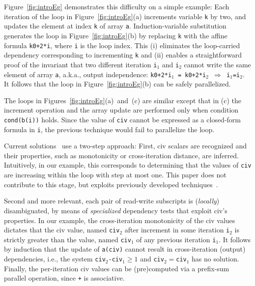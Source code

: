 \documentclass{sig-alternate}
\begin{document}
\enlargethispage{\baselineskip}

Figure~\ref{fig:introEg} demonstrates this difficulty on a
simple example:
%
Each iteration of the loop in Figure~\ref{fig:introEg}(a) increments 
variable {\tt k} by two, and updates the element at index {\tt k} of 
array {\tt a}. %
%
Induction-variable substitution generates the loop in Figure~\ref{fig:introEg}(b) 
by replacing {\tt k} with the affine formula {\tt k0+2*i}, where {\tt i} is the 
loop index.   This (i) eliminates the loop-carried dependency corresponding to 
incrementing {\tt k} and (ii) enables a straightforward proof of the invariant
that two different iteration {\tt i$_1$} and {\tt i$_2$} cannot write the same
element of array {\tt a}, a.k.a., output independence: 
{\tt k0+2*i$_1$~=~k0+2*i$_2$ $\Rightarrow$ i$_1$=i$_2$}.
It follows that the loop in Figure~\ref{fig:introEg}(b) can be safely parallelized.

The loops in Figures~\ref{fig:introEg}(a)~and~(c) are similar 
except that in (c) the increment operation and the 
array update are performed only when condition {\tt cond(b(i))} 
holds.  Since the value of {\tt civ} cannot be expressed %
as a closed-form formula in {\tt i}, the previous technique would
fail to parallelize the loop.%

Current solutions~\cite{Blume94RangeTest,SeqVars,PaduaStackArr,VEG,MonStmt,CohenBeyondMon} 
use a two-step approach:
First, {\sc civ} scalars are recognized and their properties, such as 
monotonicity or cross-iteration distance, are inferred.   
Intuitively, in our example, this corresponds to determining that 
the values of {\tt civ} are increasing %
within the loop with step at most one.
This paper does not contribute to this stage, but  
exploits previously developed techniques~\cite{VEG}.

Second and more relevant, each pair of read-write subscripts is ({\em locally}) 
disambiguated, by means of {\em specialized} dependency tests that exploit
{\sc civ}'s properties. %
In our example, the cross-iteration monotonicity of the {\sc civ} values 
dictates that the {\sc civ} value, named {\tt civ$_2$} after increment 
in some iteration {\tt i$_2$} is strictly greater than the value,
named {\tt civ$_1$} of any previous iteration {\tt i$_1$}.
It follows by induction that the update of {\tt a(civ)}
cannot result in cross-iteration (output) dependencies, i.e.,
the system {\tt civ$_2$-civ$_1 \geq 1$} and {\tt civ$_2 = $civ$_1$}
has no solution. %
Finally, the per-iteration {\sc civ} values can be (pre)computed 
via a prefix-sum parallel operation, since {\tt +} is associative.
\end{document}
